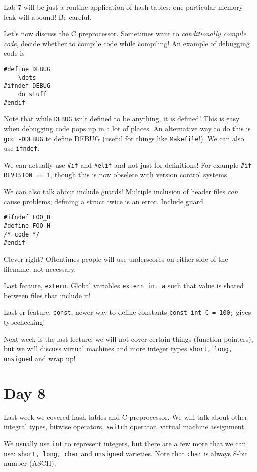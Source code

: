 \documentclass[10pt,landscape, twocolumn]{article}
\begin{document}
Lab 7 will be just a routine application of hash tables; one particular memory leak will abound! Be careful.

Let's now discuss the C preprocessor. Sometimes want to \emph{conditionally compile code}, decide whether to compile code while compiling! An example of debugging code is
\begin{verbatim}
#define DEBUG
    \dots
#ifndef DEBUG
    do stuff
#endif
\end{verbatim}

Note that while \texttt{DEBUG} isn't defined to be anything, it is defined! This is easy when debugging code pops up in a lot of places. An alternative way to do this is \texttt{gcc -DDEBUG} to define DEBUG (useful for things like \texttt{Makefile}!). We can also use \texttt{ifndef}.

We can actually use \texttt{\#if} and \texttt{\#elif} and not just for definitions! For example \texttt{\#if REVISION == 1}, though this is now obselete with version control systems.

We can also talk about include guards! Multiple inclusion of header files \emph{can} cause problems; defining a struct twice is an error. Include guard
\begin{verbatim}
#ifndef FOO_H
#define FOO_H
/* code */
#endif
\end{verbatim}

Clever right? Oftentimes people will use underscores on either side of the filename, not necessary. 

Last feature, \texttt{extern}. Global variables \texttt{extern int a} such that value is shared between files that include it!

Last-er feature, \texttt{const}, newer way to define constants \texttt{const int C = 100;} gives typechecking! 

Next week is the last lecture; we will not cover certain things (function pointers), but we will discuss virtual machines and more integer types \texttt{short, long, unsigned} and wrap up!
\section*{Day 8}

Last week we covered hash tables and C preprocessor. We will talk about other integral types, bitwise operators, \texttt{switch} operator, virtual machine assignment.

We usually use \texttt{int} to represent integers, but there are a few more that we can use: \texttt{short, long, char} and \texttt{unsigned} varieties. Note that \texttt{char} is always $8$-bit number (ASCII).
\end{document}
